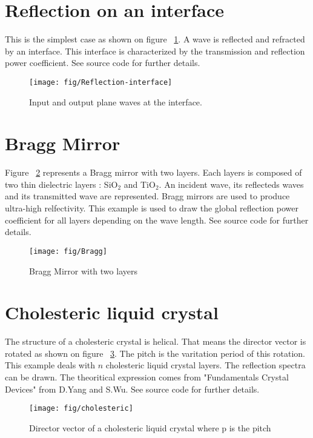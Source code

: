 

\section{Reflection on an interface}
This is the  simplest case as shown on figure ~\ref{fig:Reflection-interface}. A wave is reflected and refracted by an interface. This interface is characterized by the  transmission and reflection power coefficient. See source code for further details.
\begin{figure}[!h]
\texttt{[image: fig/Reflection-interface]}
\caption{\label{fig:Reflection-interface}Input and output plane waves at the interface.}
\end{figure}


\section{Bragg Mirror}
Figure ~\ref{fig:Bragg} represents a Bragg mirror with two layers. Each layers is composed of two thin dielectric layers : SiO$_2$ and TiO$_2$. An incident wave, its reflecteds waves and its transmitted wave are represented. Bragg mirrors are used to produce ultra-high relfectivity. This example is used to draw the global reflection power coefficient for all layers depending on the wave length. See source code for further details.
\begin{figure}[!h]
\texttt{[image: fig/Bragg]}
\caption{\label{fig:Bragg}Bragg Mirror with two layers}
\end{figure}

\section{Cholesteric liquid crystal}
The structure of a cholesteric crystal is helical. That means the director vector is rotated as shown on figure ~\ref{fig:cholesteric}. The pitch is the varitation period of this rotation.
This example deals with $n$ cholesteric liquid crystal layers. The reflection spectra can be drawn. The theoritical expression comes from "Fundamentals Crystal Devices" from D.Yang and S.Wu. See source code for further details.
\begin{figure}[!h]
\texttt{[image: fig/cholesteric]}
\caption{\label{fig:cholesteric}Director vector of a cholesteric liquid crystal where p is the pitch}
\end{figure}
